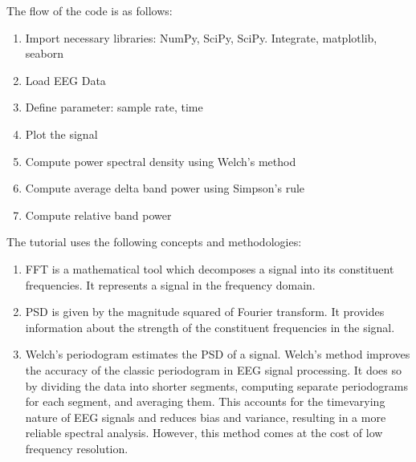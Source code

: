 \documentclass[letterpaper,10pt,english]{sphinxmanual}
\begin{document}
\sphinxAtStartPar
The flow of the code is as follows:
\begin{enumerate}
%
\item {} 
\sphinxAtStartPar
Import necessary libraries: NumPy, SciPy, SciPy. Integrate, matplotlib, seaborn

\item {} 
\sphinxAtStartPar
Load EEG Data

\item {} 
\sphinxAtStartPar
Define parameter: sample rate, time

\item {} 
\sphinxAtStartPar
Plot the signal

\item {} 
\sphinxAtStartPar
Compute power spectral density using Welch’s method

\item {} 
\sphinxAtStartPar
Compute average delta band power using Simpson’s rule

\item {} 
\sphinxAtStartPar
Compute relative band power

\end{enumerate}

\sphinxAtStartPar
The tutorial uses the following concepts and methodologies:
\begin{enumerate}
%
\item {} 
\sphinxAtStartPar
{} FFT is a mathematical tool which decomposes a signal into its constituent frequencies. It represents a signal in the frequency domain.

\item {} 
\sphinxAtStartPar
{} PSD is given by the magnitude squared of Fourier transform. It provides information about the strength of the constituent frequencies in the signal.

\item {} 
\sphinxAtStartPar
{} Welch’s periodogram estimates the PSD of a signal. Welch’s method improves the accuracy of the classic periodogram in EEG signal processing. It does so by dividing the data into shorter segments, computing separate periodograms for each segment, and averaging them. This accounts for the time\sphinxhyphen{}varying nature of EEG signals and reduces bias and variance, resulting in a more reliable spectral analysis. However, this method comes at the cost of low frequency resolution.

\end{enumerate}
\end{document}
